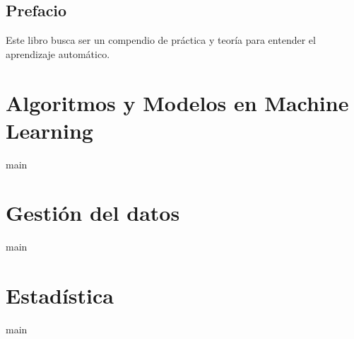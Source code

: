 \documentclass[12pt]{book}
\title{}
\author{}
\date{}
\begin{document}

\frontmatter 

\maketitle %

\tableofcontents %
\listoffigures %
\listoftables  %
\chapter{Prefacio}
Este libro busca ser un compendio de práctica y teoría para entender el aprendizaje automático.

\mainmatter 
\part{Algoritmos y Modelos en Machine Learning}
{main}
\part{Gestión del datos}
{main}
\part{Estadística}
{main}


\backmatter 

 


\end{document}
